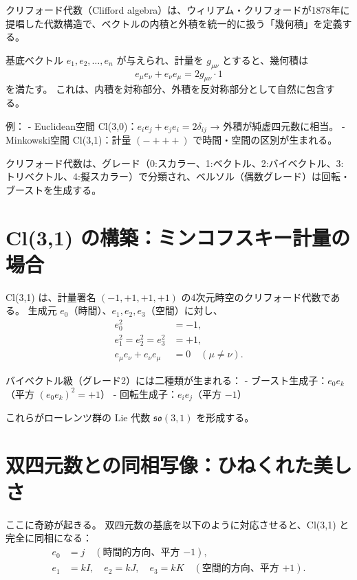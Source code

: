 \documentclass[dvipdfmx,a4paper]{jsbook}
\theoremstyle{definition}
\theoremstyle{remark}
\begin{document}
クリフォード代数（Clifford algebra）は、ウィリアム・クリフォードが1878年に提唱した代数構造で、ベクトルの内積と外積を統一的に扱う「幾何積」を定義する。

基底ベクトル $e_1, e_2, \dots, e_n$ が与えられ、計量を $g_{\mu\nu}$ とすると、幾何積は
\begin{equation}
  e_\mu e_\nu + e_\nu e_\mu = 2 g_{\mu\nu} \cdot 1
\end{equation}
を満たす。
これは、内積を対称部分、外積を反対称部分として自然に包含する。

例：
- Euclidean空間 Cl(3,0)：$e_i e_j + e_j e_i = 2\delta_{ij}$ → 外積が純虚四元数に相当。
- Minkowski空間 Cl(3,1)：計量 $(-+++)$ で時間・空間の区別が生まれる。

クリフォード代数は、グレード（0:スカラー、1:ベクトル、2:バイベクトル、3:トリベクトル、4:擬スカラー）で分類され、ベルソル（偶数グレード）は回転・ブーストを生成する。

\section{Cl(3,1) の構築：ミンコフスキー計量の場合}
\label{sec:cl31-construction}

Cl(3,1) は、計量署名 $(-1,+1,+1,+1)$ の4次元時空のクリフォード代数である。
生成元 $e_0$（時間）、$e_1,e_2,e_3$（空間）に対し、
\begin{align}
  e_0^2 &= -1, \\
  e_1^2 = e_2^2 = e_3^2 &= +1, \\
  e_\mu e_\nu + e_\nu e_\mu &= 0 \quad (\mu \neq \nu).
\end{align}

バイベクトル級（グレード2）には二種類が生まれる：
- ブースト生成子：$e_0 e_k$（平方 $(e_0 e_k)^2 = +1$）
- 回転生成子：$e_i e_j$（平方 $-1$）

これらがローレンツ群の Lie 代数 $\mathfrak{so}(3,1)$ を形成する。

\section{双四元数との同相写像：ひねくれた美しさ}
\label{sec:isomorphism-twist}

ここに奇跡が起きる。
双四元数の基底を以下のように対応させると、Cl(3,1) と完全に同相になる：
\begin{align}
  e_0 &= j \quad (\text{時間的方向、平方 $-1$}), \\
  e_1 &= kI, \quad e_2 = kJ, \quad e_3 = kK \quad (\text{空間的方向、平方 $+1$}).
\end{align}
\end{document}

